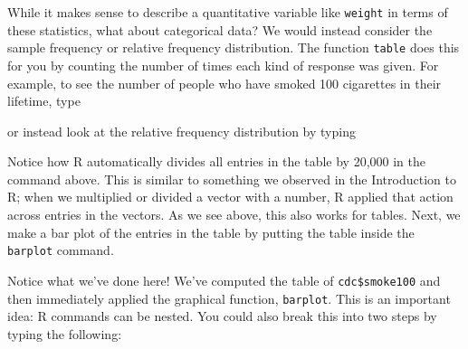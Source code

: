 \documentclass[]{book}
\newenvironment{Shaded}{\begin{snugshade}}{\end{snugshade}}
\newcommand{\DecValTok}[1]{\textcolor[rgb]{0.00,0.00,0.81}{#1}}
\newcommand{\KeywordTok}[1]{\textcolor[rgb]{0.13,0.29,0.53}{\textbf{#1}}}
\newcommand{\NormalTok}[1]{#1}
\newcommand{\OperatorTok}[1]{\textcolor[rgb]{0.81,0.36,0.00}{\textbf{#1}}}
\newcommand{\StringTok}[1]{\textcolor[rgb]{0.31,0.60,0.02}{#1}}
\theoremstyle{definition}
\theoremstyle{definition}
\theoremstyle{definition}
\theoremstyle{remark}
\begin{document}
While it makes sense to describe a quantitative variable like
\texttt{weight} in terms of these statistics, what about categorical
data? We would instead consider the sample frequency or relative
frequency distribution. The function \texttt{table} does this for you by
counting the number of times each kind of response was given. For
example, to see the number of people who have smoked 100 cigarettes in
their lifetime, type

\begin{Shaded}
\end{Shaded}

or instead look at the relative frequency distribution by typing

\begin{Shaded}
\end{Shaded}

Notice how R automatically divides all entries in the table by 20,000 in
the command above. This is similar to something we observed in the
Introduction to R; when we multiplied or divided a vector with a number,
R applied that action across entries in the vectors. As we see above,
this also works for tables. Next, we make a bar plot of the entries in
the table by putting the table inside the \texttt{barplot} command.

\begin{Shaded}
\end{Shaded}

Notice what we've done here! We've computed the table of
\texttt{cdc\$smoke100} and then immediately applied the graphical
function, \texttt{barplot}. This is an important idea: R commands can be
nested. You could also break this into two steps by typing the
following:

\begin{Shaded}
\end{Shaded}
\end{document}
